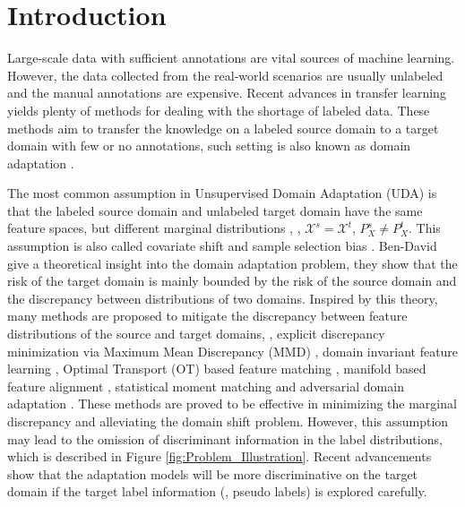 \documentclass[final]{cvpr}
\newcommand{\MC}{\mathcal}
\begin{document}
\thispagestyle{empty}
\pagestyle{empty}

\section{Introduction}
Large-scale data with sufficient annotations are vital sources of machine learning. However, the data collected from the real-world scenarios are usually unlabeled and the manual annotations are expensive. Recent advances in transfer learning yields plenty of methods for dealing with the shortage of labeled data. These methods aim to transfer the knowledge on a labeled source domain to a target domain with few or no annotations, such setting is also known as domain adaptation \cite{pan2009survey}.

The most common assumption in Unsupervised Domain Adaptation (UDA) is that the labeled source domain and unlabeled target domain have the same feature spaces, but different marginal distributions \cite{pan2009survey}, \ie, $\MC{X}^s=\MC{X}^t$, $P_X^s\neq P_X^t$. This assumption is also called covariate shift \cite{shimodaira2000improving} and sample selection bias \cite{zadrozny2004learning}. Ben-David \etal \cite{ben2007analysis} give a theoretical insight into the domain adaptation problem, they show that the risk of the target domain is mainly bounded by the risk of the source domain and the discrepancy between distributions of two domains. Inspired by this theory, many methods are proposed to mitigate the discrepancy between feature distributions of the source and target domains, \eg, explicit discrepancy minimization via Maximum Mean Discrepancy (MMD) \cite{gretton2012kernel,long2015learning}, domain invariant feature learning \cite{pan2010domain}, Optimal Transport (OT) based feature matching \cite{courty2016optimal,li2020Enhanced,zhang2019optimal}, manifold based feature alignment \cite{gong2012geodesic}, statistical moment matching \cite{long2015learning,sun2016return} and adversarial domain adaptation \cite{ganin2016domain}. These methods are proved to be effective in minimizing the marginal discrepancy and alleviating the domain shift problem. However, this assumption may lead to the omission of discriminant information in the label distributions, which is described in Figure \ref{fig:Problem_Illustration}. Recent advancements \cite{li2020maximum,long2018conditional,luo2020unsupervised} show that the adaptation models will be more discriminative on the target domain if the target label information (\eg, pseudo labels) is explored carefully.
\end{document}
